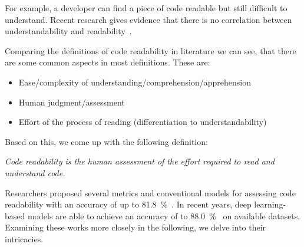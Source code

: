 \documentclass[%
class=scrreprt,
chapterprefix=false,%
open=right,%
twoside=false,%
paper=a4,%
logofile={Logo\_zentral\_farbig\_EN.png},%
thesistype=master,%
UKenglish,%
]{se2thesis}
\theoremstyle{definition}
\newtheorem{definition}{Definition}[section]
\newcommand{\citeclassicmodels}{\cite{buse2009learning, posnett2011simpler, dorn2012general, scalabrino2018comprehensive}\xspace}
\newcommand{\citedeepmodels}{\cite{mi2018inception, mi2018improving, sharma2020egan, mi2022towards, mi2022rank, mi2023graph}\xspace}
\begin{document}
	For example, a developer can find a piece of code readable but still difficult to understand. Recent research gives evidence that there is no correlation between understandability and readability~\cite{scalabrino2017automatically}.	
	
	
		

	Comparing the definitions of code readability in literature we can see, that there are some common aspects in most definitions. These are:
	\begin{itemize}
		\item Ease/complexity of understanding/comprehension/apprehension
		\item Human judgment/assessment
		\item Effort of the process of reading (differentiation to understandability)
	\end{itemize}
	Based on this, we come up with the following definition: 

	\textit{Code readability is the human assessment of the effort required to read and understand code.}

	Researchers proposed several metrics and conventional models for assessing code readability with an accuracy of up to 81.8~\%~\citeclassicmodels. In recent years, deep learning-based models are able to achieve an accuracy of to 88.0~\%~\citedeepmodels on available datasets. 
	Examining these works more closely in the following, we delve into their intricacies.
	
\end{document}

